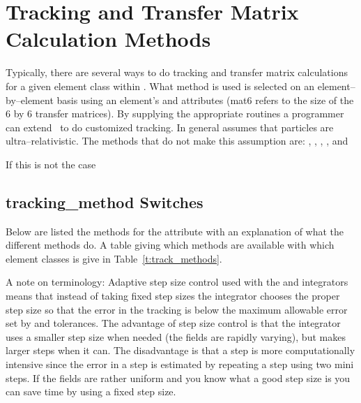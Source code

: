 \chapter{Tracking and Transfer Matrix Calculation Methods}

Typically, there are several ways to do tracking and transfer matrix
calculations for a given element class within \bmad. What method is
used is selected on an element--by--element basis using an element's
 and  attributes (mat6 refers
to the size of the 6 by 6 transfer matrices). By supplying the
appropriate routines a programmer can extend \bmad\ to do customized
tracking. In general \bmad assumes that particles are
ultra--relativistic. The methods that do not make this assumption are:
, , , , and 

If this is not the case 

\section{tracking\_method Switches}
\label{s:tkm}

Below are listed the methods for the 
attribute with an explanation of what the different methods do. A
table giving which methods are available with which element classes is give
in Table~\ref{t:track_methods}. 

A note on terminology: Adaptive step size control used with the
 and  integrators means that 
instead of taking fixed step sizes the integrator chooses the proper
step size so that the error in the tracking is below the maximum
allowable error set by  and  tolerances. The
advantage of step size control is that the integrator uses a smaller
step size when needed (the fields are rapidly varying), but makes
larger steps when it can. The disadvantage is that a step is more
computationally intensive since the error in a step is estimated by
repeating a step using two mini steps. If the fields are rather
uniform and you know what a good step size is you can save time by using
a fixed step size.

